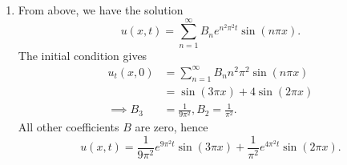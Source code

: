 \begin{derivation}
\begin{enumerate}[label=\alph*)]
      Lastly, we assume $k < 0 $ and get
      \begin{gather*}
        F(x) = A \cos \left( \sqrt{-k}x \right) + B \sin \left( \sqrt{-k}x \right) \\
        F(0) = 0 \implies A = 0 \\
        F(1) = 0 \implies B \sin \left( \sqrt{-k} \right) = 0
      .\end{gather*}
      We set $\sqrt{-k} = p$ and get
      \begin{equation*}
        F(1) = B \sin \left( p \right) = 0 \implies p = p_n = n\pi, n = 1,2,\ldots 
      .\end{equation*}
      We choose $B = 1$ and get
      \begin{equation*}
        F_n(x) = \sin (n \pi x)
      .\end{equation*}
      From the lecture notes we have that
      \begin{equation*}
        G_n(t) = B_n e^{n^2 \pi^2 t}
      .\end{equation*}
      Hence,
      \begin{align*}
        u_n(x,t) &= F_n(x) G_n(t) \\
        &= B_n e^{n^2 \pi^2 t} \sin ( n \pi x) \\
        u(x,t) &= \sum_{n = 1}^{\infty} u_n(x,t) \\
        u(x,t) &= \sum_{n = 1}^{\infty} B_n e^{n^2 \pi^2 t} \sin (n \pi x)
      .\end{align*}
    \item From above, we have the solution
      \begin{equation*}
        u(x,t) = \sum_{n = 1}^{\infty} B_n e^{n^2 \pi^2 t} \sin (n \pi x) 
      .\end{equation*}
      The initial condition gives
      \begin{align*}
        u_t(x,0) &= \sum_{n = 1}^{\infty} B_n n^2 \pi^2 \sin (n \pi x) \\
                 &= \sin (3\pi x) + 4 \sin (2\pi x) \\
        \implies B_3 &= \frac{1}{9 \pi^2}, B_2 = \frac{1}{\pi^2}
      .\end{align*}
      All other coefficients $B$ are zero, hence
      \begin{equation*}
        u(x,t) = \frac{1}{9\pi^2} e^{9 \pi^2 t} \sin (3\pi x) + \frac{1}{\pi^2} e^{4\pi^2 t} \sin(2\pi x)
      .\end{equation*}
  \end{enumerate}
\end{derivation}

